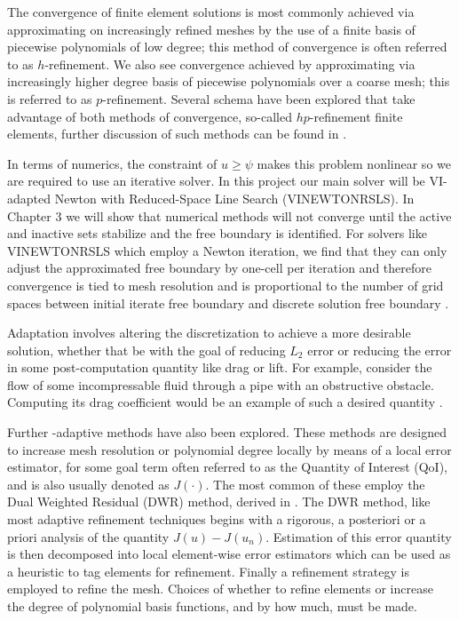 \documentclass[]{interact}
\theoremstyle{plain}%
\theoremstyle{definition}
\theoremstyle{remark}
\begin{document}
The convergence of finite element solutions is most commonly achieved via approximating on increasingly refined meshes by the use of a finite basis of piecewise polynomials of low degree; this method of convergence is often referred to as $h$-refinement. We also see convergence achieved by approximating via increasingly higher degree basis of piecewise polynomials over a coarse mesh; this is referred to as $p$-refinement. Several schema have been explored that take advantage of both methods of convergence, so-called $hp$-refinement finite elements, further discussion of such methods can be found in \cite{Demkowicz2007}.

In terms of numerics, the constraint of $u \geq \psi$ makes this problem nonlinear so we are required to use an iterative solver. In this project our main solver will be VI-adapted Newton with Reduced-Space Line Search (VINEWTONRSLS). In Chapter 3 we will show that numerical methods will not converge until the active and inactive sets stabilize and the free boundary is identified. For solvers like VINEWTONRSLS which employ a Newton iteration, we find that they can only adjust the approximated free boundary by one-cell per iteration \citep{GraeserKornhuber2009} and therefore convergence is tied to mesh resolution and is proportional to the number of grid spaces between initial iterate free boundary and discrete solution free boundary \citep[page 324]{Bueler2021}. 

Adaptation involves altering the discretization to achieve a more desirable solution, whether that be with the goal of reducing $L_2$ error or reducing the error in some post-computation quantity like drag or lift. For example, consider the flow of some incompressable fluid through a pipe with an obstructive obstacle. Computing its drag coefficient would be an example of such a desired quantity \citep[Chapter 1.1]{BangerthRannacher2003}.

Further -adaptive methods have also been explored. These methods are designed to increase mesh resolution or polynomial degree locally by means of a local error estimator, for some goal term often referred to as the Quantity of Interest (QoI), and is also usually denoted as $J(\cdot)$. The most common of these employ the Dual Weighted Residual (DWR) method, derived in \cite{RannacherSuttmeier1997}. The DWR method, like most adaptive refinement techniques begins with a rigorous, a posteriori or a priori analysis of the quantity $J(u) - J(u_n)$. Estimation of this error quantity is then decomposed into local element-wise error estimators which can be used as a heuristic to tag elements for refinement. Finally a refinement strategy is employed to refine the mesh. Choices of whether to refine elements or increase the degree of polynomial basis functions, and by how much, must be made. 
\end{document}
